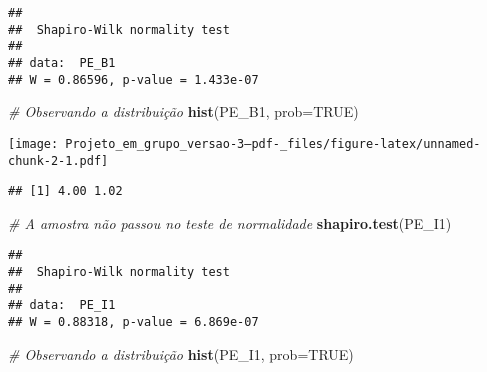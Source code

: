 \documentclass[
]{article}
\newenvironment{Shaded}{\begin{snugshade}}{\end{snugshade}}
\newcommand{\AttributeTok}[1]{\textcolor[rgb]{0.13,0.29,0.53}{#1}}
\newcommand{\CommentTok}[1]{\textcolor[rgb]{0.56,0.35,0.01}{\textit{#1}}}
\newcommand{\ConstantTok}[1]{\textcolor[rgb]{0.56,0.35,0.01}{#1}}
\newcommand{\DecValTok}[1]{\textcolor[rgb]{0.00,0.00,0.81}{#1}}
\newcommand{\FunctionTok}[1]{\textcolor[rgb]{0.13,0.29,0.53}{\textbf{#1}}}
\newcommand{\NormalTok}[1]{#1}
\newcommand{\OtherTok}[1]{\textcolor[rgb]{0.56,0.35,0.01}{#1}}
\newcommand{\SpecialCharTok}[1]{\textcolor[rgb]{0.81,0.36,0.00}{\textbf{#1}}}
\begin{document}
\begin{verbatim}
## 
##  Shapiro-Wilk normality test
## 
## data:  PE_B1
## W = 0.86596, p-value = 1.433e-07
\end{verbatim}

\begin{Shaded}
\begin{Highlighting}[]
\CommentTok{\# Observando a distribuição}
\FunctionTok{hist}\NormalTok{(PE\_B1, }\AttributeTok{prob=}\ConstantTok{TRUE}\NormalTok{)}
\end{Highlighting}
\end{Shaded}

\texttt{[image: Projeto\_em\_grupo\_versao-3--pdf-\_files/figure-latex/unnamed-chunk-2-1.pdf]}

\begin{Shaded}
\end{Shaded}

\begin{verbatim}
## [1] 4.00 1.02
\end{verbatim}

\begin{Shaded}
\begin{Highlighting}[]
\CommentTok{\# A amostra não passou no teste de normalidade}
\FunctionTok{shapiro.test}\NormalTok{(PE\_I1)}
\end{Highlighting}
\end{Shaded}

\begin{verbatim}
## 
##  Shapiro-Wilk normality test
## 
## data:  PE_I1
## W = 0.88318, p-value = 6.869e-07
\end{verbatim}

\begin{Shaded}
\begin{Highlighting}[]
\CommentTok{\# Observando a distribuição}
\FunctionTok{hist}\NormalTok{(PE\_I1, }\AttributeTok{prob=}\ConstantTok{TRUE}\NormalTok{)}
\end{Highlighting}
\end{Shaded}
\end{document}

